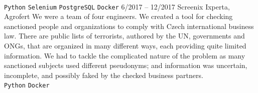 \documentclass[10pt,A4]{article}
\begin{document}
\begin{entrylist}
{				\\ 
				\texttt{Python}\slashsep
				\texttt{Selenium}\slashsep
				\texttt{PostgreSQL}\slashsep
				\texttt{Docker}
			}
		\entry
			{6/2017 -- 12/2017}
			{Screenix}
			{Ixperta, Agrofert}
			{We were a team of four engineers. We created a tool for checking sanctioned people
				and organizations to comply with Czech international business law. There are public
				lists of terrorists, authored by the UN, governments and ONGs, that are organized in
				many different ways, each providing quite limited information. We had to tackle the
				complicated nature of the problem as many sanctioned subjects used different pseudonyms;
				and information was uncertain, incomplete, and possibly faked by the checked
				business partners.
				\\ 
				\texttt{Python}\slashsep
				\texttt{Docker}
			}
	\end{entrylist}
	
	
	
	\vfill
\end{document}
